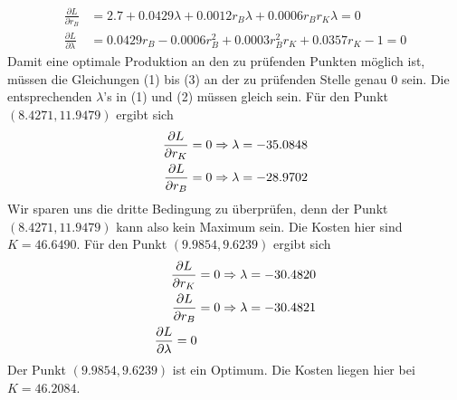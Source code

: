 \documentclass{article}
\begin{document}
\begin{enumerate}[label=(\alph*)]
\begin{align}
			\frac{\partial L}{\partial r_B} &= 2.7 + 0.0429\lambda + 0.0012 r_B\lambda + 0.0006r_Br_K\lambda =0  \\
			\frac{\partial L}{\partial \lambda} &= 0.0429r_B - 0.0006r_B^2 + 0.0003r_B^2r_K + 0.0357 r_K - 1 = 0
		\end{align}
		Damit eine optimale Produktion an den zu prüfenden Punkten möglich ist, müssen die Gleichungen (1) bis (3) an der zu prüfenden Stelle genau 0 sein. Die entsprechenden $\lambda$'s in (1) und (2) müssen gleich sein. Für den Punkt $(8.4271,11.9479)$ ergibt sich
		\begin{align}
			\frac{\partial L}{\partial r_K} &=0 \Rightarrow \lambda = -35.0848 \notag \\
			\frac{\partial L}{\partial r_B} &=0 \Rightarrow \lambda = -28.9702 \notag
		\end{align}
		Wir sparen uns die dritte Bedingung zu überprüfen, denn der Punkt $(8.4271,11.9479)$ kann also kein Maximum sein. Die Kosten hier sind $K=46.6490$. Für den Punkt $(9.9854,9.6239)$ ergibt sich
		\begin{align}
			\frac{\partial L}{\partial r_K} &=0 \Rightarrow \lambda = -30.4820 \notag \\
			\frac{\partial L}{\partial r_B} &=0 \Rightarrow \lambda = -30.4821 \notag \\
			\frac{\partial L}{\partial \lambda} = 0 \notag
		\end{align}
		Der Punkt $(9.9854,9.6239)$ ist ein Optimum. Die Kosten liegen hier bei $K=46.2084$.
	\end{enumerate}
	
\end{document}

